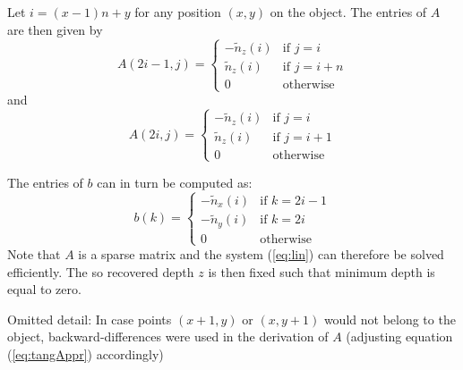 \documentclass{paper}
\begin{document}
Let $i=(x-1)n+y$ for any position $(x,y)$ on the object. The entries of $A$ are then given by
\begin{equation}
A(2i-1,j) = \begin{cases}
-\tilde{n}_z(i) &\text{if $j=i$}\\
\tilde{n}_z(i) &\text{if $j=i+n$}\\
0 &\text{otherwise}
\end{cases}
\end{equation}
and 
\begin{equation}
A(2i,j) = \begin{cases}
-\tilde{n}_z(i) &\text{if $j=i$}\\
\tilde{n}_z(i) &\text{if $j=i+1$}\\
0 &\text{otherwise}
\end{cases}
\end{equation}

The entries of $b$ can in turn be  computed as:
\begin{equation}
b(k) = \begin{cases}
-\tilde{n}_x(i) &\text{if $k=2i-1$}\\
-\tilde{n}_y(i) &\text{if $k=2i$}\\
0 &\text{otherwise}
\end{cases}
\end{equation}
Note that $A$ is a sparse matrix and the system (\ref{eq:lin}) can
therefore be solved efficiently. The so recovered depth $z$ is then
fixed such that minimum depth is equal to zero. 

Omitted detail: In case points $(x+1,y)$ or $(x,y+1)$ would not belong to the object, backward-differences were used in the derivation of $A$ (adjusting equation (\ref{eq:tangAppr}) accordingly) 
\end{document}
